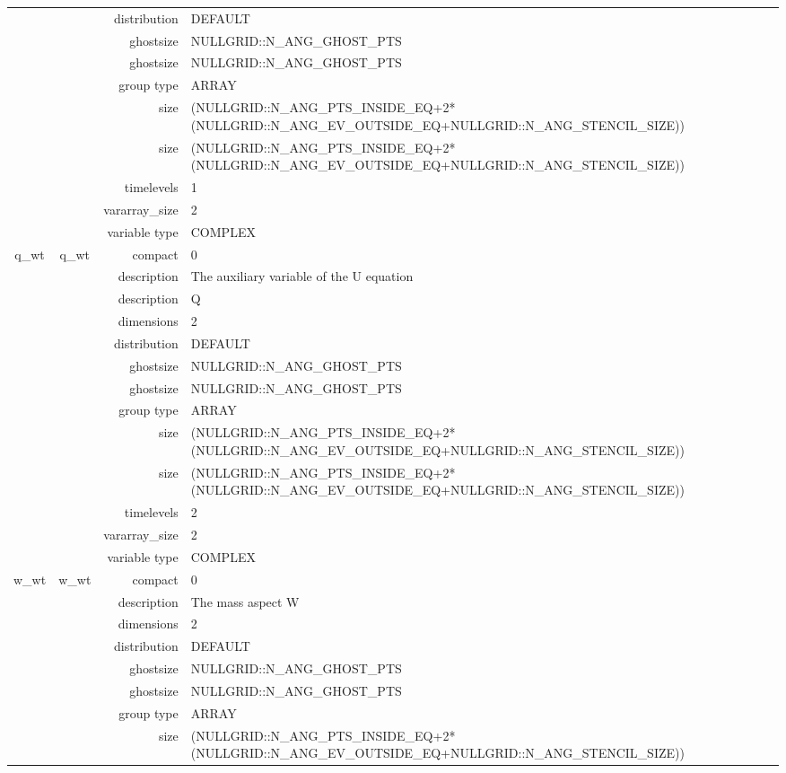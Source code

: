 \begin{tabular*}{150mm}{|c|c@{\extracolsep{\fill}}|rl|}
 &  & distribution & DEFAULT \\ 
 &  & ghostsize & NULLGRID::N\_ANG\_GHOST\_PTS \\ 
& ~ & ghostsize & NULLGRID::N\_ANG\_GHOST\_PTS \\ 
 &  & group type & ARRAY \\ 
 &  & size & (NULLGRID::N\_ANG\_PTS\_INSIDE\_EQ+2*(NULLGRID::N\_ANG\_EV\_OUTSIDE\_EQ+NULLGRID::N\_ANG\_STENCIL\_SIZE)) \\ 
& ~ & size & (NULLGRID::N\_ANG\_PTS\_INSIDE\_EQ+2*(NULLGRID::N\_ANG\_EV\_OUTSIDE\_EQ+NULLGRID::N\_ANG\_STENCIL\_SIZE)) \\ 
 &  & timelevels & 1 \\ 
 &  & vararray\_size & 2 \\ 
 &  & variable type & COMPLEX \\ 
\hline 
q\_wt & q\_wt & compact & 0 \\ 
 &  & description & The auxiliary variable of the U equation \\ 
& ~ & description &  Q \\ 
 &  & dimensions & 2 \\ 
 &  & distribution & DEFAULT \\ 
 &  & ghostsize & NULLGRID::N\_ANG\_GHOST\_PTS \\ 
& ~ & ghostsize & NULLGRID::N\_ANG\_GHOST\_PTS \\ 
 &  & group type & ARRAY \\ 
 &  & size & (NULLGRID::N\_ANG\_PTS\_INSIDE\_EQ+2*(NULLGRID::N\_ANG\_EV\_OUTSIDE\_EQ+NULLGRID::N\_ANG\_STENCIL\_SIZE)) \\ 
& ~ & size & (NULLGRID::N\_ANG\_PTS\_INSIDE\_EQ+2*(NULLGRID::N\_ANG\_EV\_OUTSIDE\_EQ+NULLGRID::N\_ANG\_STENCIL\_SIZE)) \\ 
 &  & timelevels & 2 \\ 
 &  & vararray\_size & 2 \\ 
 &  & variable type & COMPLEX \\ 
\hline 
w\_wt & w\_wt & compact & 0 \\ 
 &  & description & The mass aspect W \\ 
 &  & dimensions & 2 \\ 
 &  & distribution & DEFAULT \\ 
 &  & ghostsize & NULLGRID::N\_ANG\_GHOST\_PTS \\ 
& ~ & ghostsize & NULLGRID::N\_ANG\_GHOST\_PTS \\ 
 &  & group type & ARRAY \\ 
 &  & size & (NULLGRID::N\_ANG\_PTS\_INSIDE\_EQ+2*(NULLGRID::N\_ANG\_EV\_OUTSIDE\_EQ+NULLGRID::N\_ANG\_STENCIL\_SIZE)) \\ 

\end{tabular*}
